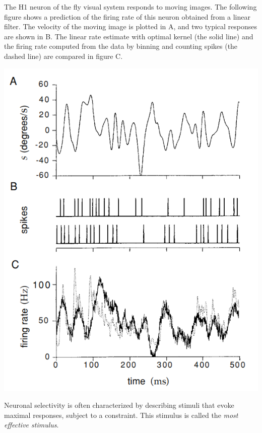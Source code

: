 \begin{exm}
  \label{exm:flyH1LinearEstimate}
  The H1 neuron of the fly visual system responds to moving images. The following figure shows a prediction of the firing rate of this neuron obtained from a linear filter. The velocity of the moving image is plotted in A, and two typical responses are shown in B. The linear rate estimate with optimal kernel (the solid line) and the firing rate computed from the data by binning and counting spikes (the dashed line) are compared in figure C.
  \begin{center}
    \includegraphics[scale=0.35]{./png/linearFilter}
  \end{center}
\end{exm}

\begin{defn}
  Neuronal selectivity is often characterized by describing stimuli that evoke maximal responses, subject to a constraint. This stimulus is called the \emph{most effective stimulus}.
\end{defn}

